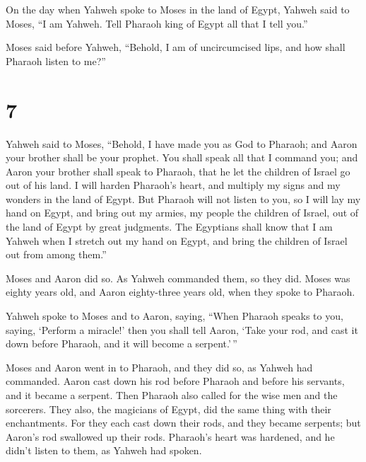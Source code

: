  On the day when Yahweh spoke to Moses in the land of
Egypt,  Yahweh said to Moses, ``I am Yahweh. Tell Pharaoh
king of Egypt all that I tell you.''

 Moses said before Yahweh, ``Behold, I am of
uncircumcised lips, and how shall Pharaoh listen to me?''

\hypertarget{section-6}{%
\section{7}\label{section-6}}

 Yahweh said to Moses, ``Behold, I have made you as God to
Pharaoh; and Aaron your brother shall be your prophet. 
You shall speak all that I command you; and Aaron your brother shall
speak to Pharaoh, that he let the children of Israel go out of his land.
 I will harden Pharaoh's heart, and multiply my signs and
my wonders in the land of Egypt.  But Pharaoh will not
listen to you, so I will lay my hand on Egypt, and bring out my armies,
my people the children of Israel, out of the land of Egypt by great
judgments.  The Egyptians shall know that I am Yahweh when
I stretch out my hand on Egypt, and bring the children of Israel out
from among them.''

 Moses and Aaron did so. As Yahweh commanded them, so they
did.  Moses was eighty years old, and Aaron eighty-three
years old, when they spoke to Pharaoh.

 Yahweh spoke to Moses and to Aaron, saying,
 ``When Pharaoh speaks to you, saying, `Perform a
miracle!' then you shall tell Aaron, `Take your rod, and cast it down
before Pharaoh, and it will become a serpent.'\,''

 Moses and Aaron went in to Pharaoh, and they did so, as
Yahweh had commanded. Aaron cast down his rod before Pharaoh and before
his servants, and it became a serpent.  Then Pharaoh also
called for the wise men and the sorcerers. They also, the magicians of
Egypt, did the same thing with their enchantments.  For
they each cast down their rods, and they became serpents; but Aaron's
rod swallowed up their rods.  Pharaoh's heart was
hardened, and he didn't listen to them, as Yahweh had spoken.

